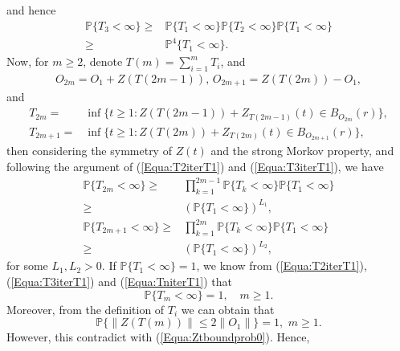 \documentclass[11pt]{article}
\theoremstyle{definition}
\theoremstyle{remark}
\numberwithin{equation}{section}
\begin{document}
and hence
\begin{equation}\label{Equa:T3iterT1}
\begin{split}
 \mathbb{P}\{T_3<\infty\}\geq&\mathbb{P}\{T_1<\infty\}\mathbb{P}\{T_2<\infty\}\mathbb{P}\{T_1<\infty\}\\
 \geq&\mathbb{P}^4\{T_1<\infty\}.
 \end{split}
\end{equation}
Now, for $m\geq 2$, denote $T(m)=\sum_{i=1}^{m}T_i$, and
\begin{equation*}
  \begin{split}
  O_{2m}=O_1+Z(T(2m-1)), \,O_{2m+1}=Z(T(2m))-O_1,
  \end{split}
\end{equation*}
and
\begin{equation}
\begin{split}
  T_{2m}=&\inf\bigg\{t\geq 1: Z(T(2m-1))+Z_{T(2m-1)}(t)\in B_{O_{2m}}(r)\bigg\},\\
  T_{2m+1}=&\inf\bigg\{t\geq 1: Z(T(2m))+Z_{T(2m)}(t)\in B_{O_{2m+1}}(r)\bigg\},
  \end{split}
\end{equation}
then considering the symmetry of $Z(t)$ and the strong Morkov property, and following the argument of (\ref{Equa:T2iterT1}) and (\ref{Equa:T3iterT1}), we have
\begin{equation}\label{Equa:TniterT1}
\begin{split}
  \mathbb{P}\{T_{2m}<\infty\}\geq&\prod_{k=1}^{2m-1}\mathbb{P}\{T_k<\infty\}\mathbb{P}\{T_1<\infty\}\\
  \geq&(\mathbb{P}\{T_1<\infty\})^{L_1},\\
  \mathbb{P}\{T_{2m+1}<\infty\}\geq&\prod_{k=1}^{2m}\mathbb{P}\{T_k<\infty\}\mathbb{P}\{T_1<\infty\}\\
  \geq&(\mathbb{P}\{T_1<\infty\})^{L_2},
  \end{split}
\end{equation}
for some $L_1, L_2>0$.
If $\mathbb{P}\{T_1<\infty\}=1$, we know from (\ref{Equa:T2iterT1}), (\ref{Equa:T3iterT1}) and (\ref{Equa:TniterT1}) that
\begin{equation}\label{Equa:Tnleqinfty}
  \mathbb{P}\{T_m<\infty\}=1,\quad m\geq 1.
\end{equation}
Moreover, from the definition of $T_i$ we can obtain that
\begin{equation*}
  \mathbb{P}\bigg\{\| Z(T(m))\|\leq 2\| O_1\|\bigg\}=1,\,\,m\geq 1.
\end{equation*}
However, this contradict with (\ref{Equa:Ztboundprob0}). Hence,
\end{document}
